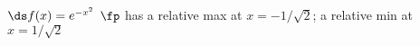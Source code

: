 {$\ds f(x) = e^{-x^2}$
}
{$\fp$ has a relative max at $x=-1/\sqrt{2}$; a relative min at $x=1/\sqrt{2}$
}
